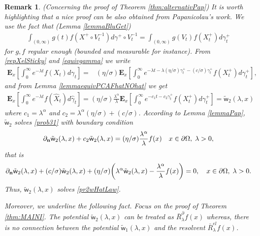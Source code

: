 \documentclass[11pt,a4paper]{article}
\newtheorem{remark}{Remark}[section]
\begin{document}
\begin{remark}
\label{remarkPAPalternative}
(Concerning the proof of Theorem \ref{thm:alternativPap}) It is worth highlighting that a nice proof can be also obtained from Papanicolau's work. We use the fact that (Lemma \ref{lemmaBluGet})
\begin{align*}
\int_{(0, \infty)} g(t) f(X^+ \circ V^{-1}_t) d\gamma^+ \circ V^{-1}_t = \int_{(0, \infty)} g(V_t) f(X^+_t) d\gamma^+_t
\end{align*}
for $g,f$ regular enough (bounded and measurable for instance). From \eqref{repXelSticky} and \eqref{equivgamma} we write
\begin{align*}
\mathbf{E}_x\left[ \int_0^\infty e^{-\lambda t} f(X_t) d\gamma_t \right]
= & (\eta /\sigma) \mathbf{E}_x\left[ \int_0^\infty e^{-\lambda t - \lambda (\eta /\sigma) \gamma^+_t - (c/\sigma) \gamma^+_t} f(X^+_t) d\gamma^+_t \right],
\end{align*}
and from Lemma \ref{lemmaequivPCAFhatNOhat} we get
\begin{align}
\label{TMPLemmavarpi}
\mathbf{E}_x\left[\int_0^\infty e^{-\lambda t} f(\hat{X}_t) d\hat{\gamma}_t \right] = (\eta /\sigma) \frac{\lambda^\alpha}{\lambda}  \mathbf{E}_x\left[ \int_0^\infty e^{-c_1 t - c_2 \gamma^+_t} f(X^+_t) d\gamma^+_t \right] = \tilde{\mathsf{w}}_2(\lambda, x)
\end{align}
where $c_1=\lambda^\alpha$ and $c_2=\lambda^\alpha (\eta /\sigma) + (c/\sigma)$. According to Lemma \ref{lemmaPap}, $\tilde{\mathsf{w}}_2$ solves \eqref{prob31} with boundary condition
\begin{align*}
\partial_{\bf n} \tilde{\mathsf{w}}_2(\lambda, x) + c_2 \tilde{\mathsf{w}}_2(\lambda, x) = (\eta/\sigma) \frac{\lambda^\alpha}{\lambda} f(x) \quad x\in \partial \Omega, \; \lambda>0, 
\end{align*}
that is
\begin{align}
\label{conLTvarpi}
\partial_{\bf n} \tilde{\mathsf{w}}_2(\lambda, x) + (c/\sigma) \tilde{\mathsf{w}}_2(\lambda, x) + (\eta/\sigma) \bigg( \lambda^\alpha \tilde{\mathsf{w}}_2(\lambda, x)  - \frac{\lambda^\alpha}{\lambda} f(x) \bigg) =0, \quad x \in \partial \Omega, \; \lambda>0. 
\end{align}
Thus, $\tilde{\mathsf{w}}_2(\lambda, x)$ solves \eqref{pr2wHatLaw}. 

Moreover, we underline the following fact. Focus on the proof of Theorem \ref{thm:MAINI}. The potential $\tilde{\mathsf{w}}_2(\lambda, x)$ can be treated as $\bar{R}^\partial_\lambda f(x)$ whereas, there is no connection between the potential $\tilde{\mathsf{w}}_1(\lambda, x)$ and the resolvent $\bar{R}^{el}_\lambda f(x)$.
\end{remark}
\end{document}
